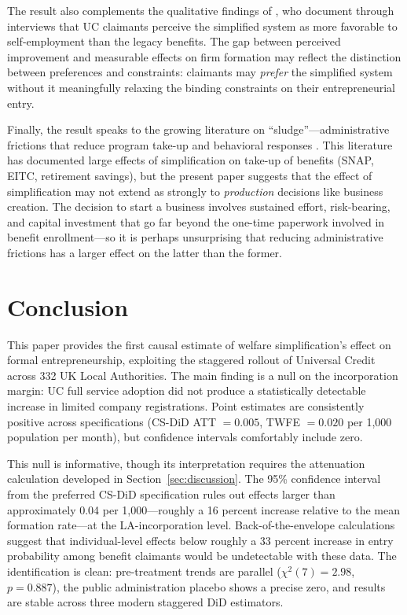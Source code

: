 \documentclass[12pt]{article}
\begin{document}
The result also complements the qualitative findings of \citet{griffiths2024going}, who document through interviews that UC claimants perceive the simplified system as more favorable to self-employment than the legacy benefits. The gap between perceived improvement and measurable effects on firm formation may reflect the distinction between preferences and constraints: claimants may \textit{prefer} the simplified system without it meaningfully relaxing the binding constraints on their entrepreneurial entry.

Finally, the result speaks to the growing literature on ``sludge''---administrative frictions that reduce program take-up and behavioral responses \citep{bhargava2015psychological, finkelstein2019take}. This literature has documented large effects of simplification on take-up of benefits (SNAP, EITC, retirement savings), but the present paper suggests that the effect of simplification may not extend as strongly to \textit{production} decisions like business creation. The decision to start a business involves sustained effort, risk-bearing, and capital investment that go far beyond the one-time paperwork involved in benefit enrollment---so it is perhaps unsurprising that reducing administrative frictions has a larger effect on the latter than the former.


\section{Conclusion}
\label{sec:conclusion}

This paper provides the first causal estimate of welfare simplification's effect on formal entrepreneurship, exploiting the staggered rollout of Universal Credit across 332 UK Local Authorities. The main finding is a null on the incorporation margin: UC full service adoption did not produce a statistically detectable increase in limited company registrations. Point estimates are consistently positive across specifications (CS-DiD ATT $= 0.005$, TWFE $= 0.020$ per 1,000 population per month), but confidence intervals comfortably include zero.

This null is informative, though its interpretation requires the attenuation calculation developed in Section~\ref{sec:discussion}. The 95\% confidence interval from the preferred CS-DiD specification rules out effects larger than approximately 0.04 per 1,000---roughly a 16 percent increase relative to the mean formation rate---at the LA-incorporation level. Back-of-the-envelope calculations suggest that individual-level effects below roughly a 33 percent increase in entry probability among benefit claimants would be undetectable with these data. The identification is clean: pre-treatment trends are parallel ($\chi^2(7) = 2.98$, $p = 0.887$), the public administration placebo shows a precise zero, and results are stable across three modern staggered DiD estimators.
\end{document}
